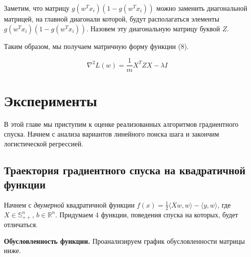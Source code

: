 \documentclass{article}
\begin{document}
	Заметим, что матрицу $g(w^Tx_i) (1 - g(w^Tx_i))$ можно заменить диагональной матрицей, на главной диагонали которой, будут располагаться элементы $g(w^Tx_i) (1 - g(w^Tx_i))$. Назовем эту диагональную матрицу буквой $Z$.
	
	\vspace{0.5cm}
	Таким образом, мы получаем матричную форму функции (8).
	
	\begin{equation}
		\nabla^2 L(w) = \frac{1}{m} X^T Z X - \lambda I
	\end{equation}
	
	\vspace{2cm}
	
	\section{Эксперименты}
	
	В этой главе мы приступим к оценке реализованных алгоритмов градиентного спуска. Начнем с анализа вариантов линейного поиска шага и закончим логистической регрессией. 
	
	\subsection{Траектория градиентного спуска на квадратичной функции}
	
	Начнем с {\it двумерной} квадратичной функции $f(x) = \frac{1}{2} \langle Xw, w \rangle  - \langle y, w \rangle $, где $X \in \mathbb{S}_{++}^n$, $b \in \mathbb{R}^n$. Придумаем 4 функции, поведения спуска на которых, будет отличаться.
	
	\vspace{0.5cm}
	{\bf Обусловленность функции.} Проанализируем график обусловленности матрицы ниже.
\end{document}
